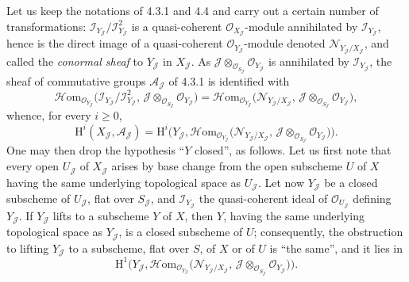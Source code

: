 \label{III.4.5.0}%
{\renewcommand{\thefootnote}{(81)}}
Let us keep the notations of 4.3.1 and 4.4 and carry out a certain number of transformations: \(\mathcal{I}_{Y_{\mathcal{J}}}/\mathcal{I}_{Y_{\mathcal{J}}}^{2}\) is a quasi-coherent \(\mathcal{O}_{X_{\mathcal{J}}}\)-module annihilated by \(\mathcal{I}_{Y_{\mathcal{J}}}\), hence is the direct image of a quasi-coherent \(\mathcal{O}_{Y_{\mathcal{J}}}\)-module denoted \(\mathcal{N}_{Y_{\mathcal{J}}/X_{\mathcal{J}}}\), and called the \emph{conormal sheaf} to \(Y_{\mathcal{J}}\) in \(X_{\mathcal{J}}\).
{\renewcommand{\thefootnote}{(82)}}
As \(\mathcal{J}\otimes_{\mathcal{O}_{S_{\mathcal{J}}}}\mathcal{O}_{Y_{\mathcal{J}}}\) is annihilated by \(\mathcal{I}_{Y_{\mathcal{J}}}\), the sheaf of commutative groups \(\mathcal{A}_{\mathcal{J}}\) of 4.3.1 is identified with
\[
\mathcal{H}\mathrm{om}_{\mathcal{O}_{Y_{\mathcal{J}}}}\bigl(\mathcal{I}_{Y_{\mathcal{J}}}/\mathcal{I}_{Y_{\mathcal{J}}}^{2},\,\mathcal{J}\otimes_{\mathcal{O}_{S_{\mathcal{J}}}}\mathcal{O}_{Y_{\mathcal{J}}}\bigr)
=
\mathcal{H}\mathrm{om}_{\mathcal{O}_{Y_{\mathcal{J}}}}\bigl(\mathcal{N}_{Y_{\mathcal{J}}/X_{\mathcal{J}}},\,\mathcal{J}\otimes_{\mathcal{O}_{S_{\mathcal{J}}}}\mathcal{O}_{Y_{\mathcal{J}}}\bigr),
\]
whence, for every \(i\geqslant 0\),
\[
\mathrm{H}^{i}(X_{\mathcal{J}},\mathcal{A}_{\mathcal{J}})
=
\mathrm{H}^{i}\bigl(Y_{\mathcal{J}},\mathcal{H}\mathrm{om}_{\mathcal{O}_{Y_{\mathcal{J}}}}\bigl(\mathcal{N}_{Y_{\mathcal{J}}/X_{\mathcal{J}}},\,\mathcal{J}\otimes_{\mathcal{O}_{S_{\mathcal{J}}}}\mathcal{O}_{Y_{\mathcal{J}}}\bigr)\bigr).
\]
{\renewcommand{\thefootnote}{(83)}}
One may then drop the hypothesis ``\(Y\) closed'', as follows. Let us first note that every open \(U_{\mathcal{J}}\) of \(X_{\mathcal{J}}\) arises by base change from the open subscheme \(U\) of \(X\) having the same underlying topological space as \(U_{\mathcal{J}}\). Let now \(Y_{\mathcal{J}}\) be a closed subscheme of \(U_{\mathcal{J}}\), flat over \(S_{\mathcal{J}}\), and \(\mathcal{I}_{Y_{\mathcal{J}}}\) the quasi-coherent ideal of \(\mathcal{O}_{U_{\mathcal{J}}}\) defining \(Y_{\mathcal{J}}\). If \(Y_{\mathcal{J}}\) lifts to a subscheme \(Y\) of \(X\), then \(Y\), having the same underlying topological space as \(Y_{\mathcal{J}}\), is a closed subscheme of \(U\); consequently, the obstruction to lifting \(Y_{\mathcal{J}}\) to a subscheme, flat over \(S\), of \(X\) or of \(U\) is ``the same'', and it lies in
\[
\mathrm{H}^{1}\bigl(Y_{\mathcal{J}},\mathcal{H}\mathrm{om}_{\mathcal{O}_{Y_{\mathcal{J}}}}\bigl(\mathcal{N}_{Y_{\mathcal{J}}/X_{\mathcal{J}}},\,\mathcal{J}\otimes_{\mathcal{O}_{S_{\mathcal{J}}}}\mathcal{O}_{Y_{\mathcal{J}}}\bigr)\bigr).
\]


